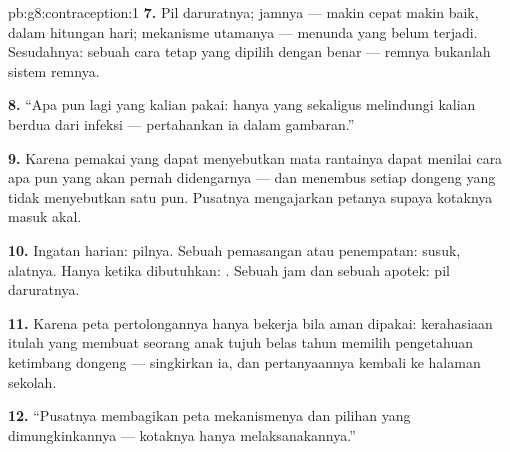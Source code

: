 \begin{solution}{pb:g8:contraception:1}
\textbf{7.} Pil daruratnya; jamnya --- makin cepat makin
baik, dalam hitungan hari; mekanisme utamanya --- menunda
 yang belum terjadi. Sesudahnya: sebuah cara tetap
yang dipilih dengan benar --- remnya bukanlah sistem remnya.

\textbf{8.} ``Apa pun lagi yang kalian pakai: hanya 
yang sekaligus melindungi kalian berdua dari infeksi ---
pertahankan ia dalam gambaran.''

\textbf{9.} Karena pemakai yang dapat menyebutkan mata
rantainya dapat menilai cara apa pun yang akan pernah
didengarnya --- dan menembus setiap dongeng yang tidak
menyebutkan satu pun. Pusatnya mengajarkan petanya supaya
kotaknya masuk akal.

\textbf{10.} Ingatan harian: pilnya. Sebuah pemasangan atau
penempatan: susuk, alatnya. Hanya ketika dibutuhkan:
. Sebuah jam dan sebuah apotek: pil daruratnya.

\textbf{11.} Karena peta pertolongannya hanya bekerja bila
aman dipakai: kerahasiaan itulah yang membuat seorang anak
tujuh belas tahun memilih pengetahuan ketimbang dongeng ---
singkirkan ia, dan pertanyaannya kembali ke halaman sekolah.

\textbf{12.} ``Pusatnya membagikan peta mekanismenya dan
pilihan yang dimungkinkannya --- kotaknya hanya
melaksanakannya.''
\end{solution}
